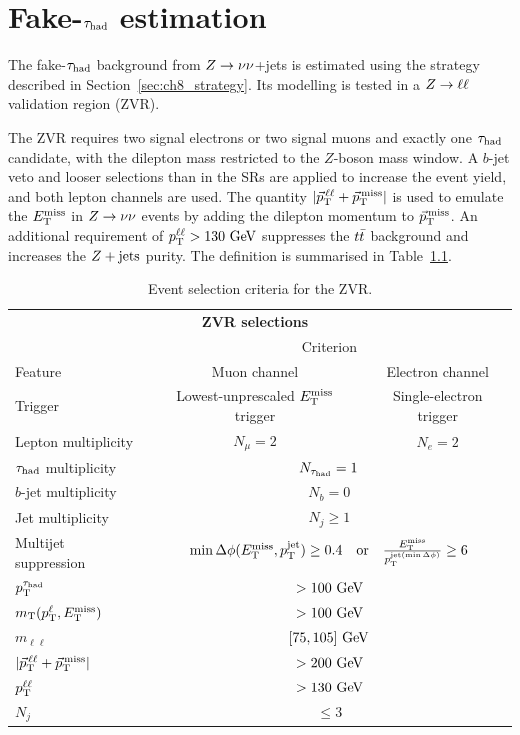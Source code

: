 \chapter[Fake-tau estimation]{Fake-$\tau_{\mathrm{had}}$ estimation}
\label{app:ch8_fake_tau}

The fake-$\tau_{\mathrm{had}}$ background from $Z\rightarrow\nu\nu$+jets is estimated using the strategy described in Section~\ref{sec:ch8_strategy}.
Its modelling is tested in a $Z\rightarrow\ell\ell$ validation region (ZVR).

The ZVR requires two signal electrons or two signal muons and exactly one $\tau_{\mathrm{had}}$ candidate, with the dilepton mass restricted to the $Z$-boson mass window.
A $b$-jet veto and looser selections than in the SRs are applied to increase the event yield, and both lepton channels are used.
The quantity $|\vec p_{\mathrm{T}}^{\,\ell\ell}+\vec p_{\mathrm{T}}^{\,\mathrm{miss}}|$ is used to emulate the $E_{\mathrm{T}}^{\mathrm{miss}}$ in $Z\rightarrow\nu\nu$ events by adding the dilepton momentum to $\vec p_{\mathrm{T}}^{\,\mathrm{miss}}$.
An additional requirement of $p_{\mathrm{T}}^{\ell\ell}>130~\mathrm{GeV}$ suppresses the $t\bar{t}$ background and increases the $Z+\mathrm{jets}$ purity.
The definition is summarised in Table~\ref{tab:app_ch8_zvr_selections}.

\begin{table}[htbp]
    \centering
    \small
    \caption[Event selections for the ZVR]{Event selection criteria for the ZVR.}
    \label{tab:app_ch8_zvr_selections}
    \begin{tabular}{lcc}
        \toprule
         & \textbf{ZVR selections} & \\
         & \multicolumn{2}{c}{Criterion} \\
        Feature & Muon channel & Electron channel \\
        \midrule
        Trigger & Lowest-unprescaled $E_{\mathrm{T}}^{\mathrm{miss}}$ trigger & Single-electron trigger \\
        Lepton multiplicity & $N_\mu=2$ & $N_e=2$ \\
        $\tau_{\mathrm{had}}$ multiplicity & \multicolumn{2}{c}{$N_{\tau_{\mathrm{had}}}=1$} \\
        $b$-jet multiplicity & \multicolumn{2}{c}{$N_b=0$} \\
        Jet multiplicity & \multicolumn{2}{c}{$N_j\geq1$} \\
        Multijet suppression & \multicolumn{2}{c}{$\min\Delta\phi(E_{\mathrm{T}}^{\mathrm{miss}},p_{\mathrm{T}}^{\mathrm{jet}})\geq0.4\quad\text{or}\quad\frac{E_{\mathrm{T}}^{\mathrm{miss}}}{p_{\mathrm{T}}^{\mathrm{jet}(\min{\Delta\phi)}}}\geq6$} \\
        \midrule
        $p_{\mathrm{T}}^{\tau_{\mathrm{had}}}$ & \multicolumn{2}{c}{$>100~\mathrm{GeV}$} \\
        $m_{\mathrm{T}}(p_{\mathrm{T}}^\ell,E_{\mathrm{T}}^{\mathrm{miss}})$ & \multicolumn{2}{c}{$>100~\mathrm{GeV}$} \\
        $m_{\ell\ell}$ & \multicolumn{2}{c}{$[75,105]~\mathrm{GeV}$} \\
        $|\vec p_{\mathrm{T}}^{\,\ell\ell}+\vec p_{\mathrm{T}}^{\,\mathrm{miss}}|$ & \multicolumn{2}{c}{$>200~\mathrm{GeV}$} \\
        $p_{\mathrm{T}}^{\ell\ell}$ & \multicolumn{2}{c}{$>130~\mathrm{GeV}$} \\
        $N_j$ & \multicolumn{2}{c}{$\leq3$} \\
        \bottomrule
    \end{tabular}
\end{table}

